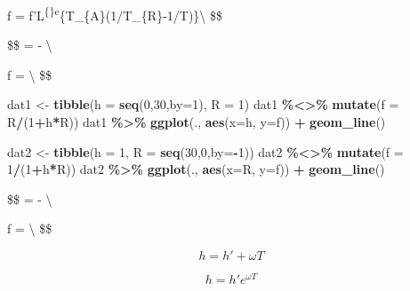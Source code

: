 \documentclass[
]{article}
\newenvironment{Shaded}{\begin{snugshade}}{\end{snugshade}}
\newcommand{\AttributeTok}[1]{\textcolor[rgb]{0.13,0.29,0.53}{#1}}
\newcommand{\DecValTok}[1]{\textcolor[rgb]{0.00,0.00,0.81}{#1}}
\newcommand{\FunctionTok}[1]{\textcolor[rgb]{0.13,0.29,0.53}{\textbf{#1}}}
\newcommand{\NormalTok}[1]{#1}
\newcommand{\OtherTok}[1]{\textcolor[rgb]{0.56,0.35,0.01}{#1}}
\newcommand{\SpecialCharTok}[1]{\textcolor[rgb]{0.81,0.36,0.00}{\textbf{#1}}}
\begin{document}
f =
f'L\textsuperscript{\{\gamma\}e}\{T\_\{A\}(1/T\_\{R\}-1/T)\}\textbackslash{}
\$\$

\$\$  = - 
\textbackslash{}

f = \textbackslash{} \$\$

\begin{Shaded}
\begin{Highlighting}[]
\NormalTok{dat1 }\OtherTok{\textless{}{-}} \FunctionTok{tibble}\NormalTok{(}\AttributeTok{h =} \FunctionTok{seq}\NormalTok{(}\DecValTok{0}\NormalTok{,}\DecValTok{30}\NormalTok{,}\AttributeTok{by=}\DecValTok{1}\NormalTok{),}
               \AttributeTok{R =} \DecValTok{1}\NormalTok{)}
\NormalTok{dat1 }\SpecialCharTok{\%\textless{}\textgreater{}\%} \FunctionTok{mutate}\NormalTok{(}\AttributeTok{f =}\NormalTok{ R}\SpecialCharTok{/}\NormalTok{(}\DecValTok{1}\SpecialCharTok{+}\NormalTok{h}\SpecialCharTok{*}\NormalTok{R))}
\NormalTok{dat1 }\SpecialCharTok{\%\textgreater{}\%} \FunctionTok{ggplot}\NormalTok{(., }\FunctionTok{aes}\NormalTok{(}\AttributeTok{x=}\NormalTok{h, }\AttributeTok{y=}\NormalTok{f)) }\SpecialCharTok{+} \FunctionTok{geom\_line}\NormalTok{()}

\NormalTok{dat2 }\OtherTok{\textless{}{-}} \FunctionTok{tibble}\NormalTok{(}\AttributeTok{h =} \DecValTok{1}\NormalTok{,}
               \AttributeTok{R =} \FunctionTok{seq}\NormalTok{(}\DecValTok{30}\NormalTok{,}\DecValTok{0}\NormalTok{,}\AttributeTok{by=}\SpecialCharTok{{-}}\DecValTok{1}\NormalTok{))}
\NormalTok{dat2 }\SpecialCharTok{\%\textless{}\textgreater{}\%} \FunctionTok{mutate}\NormalTok{(}\AttributeTok{f =} \DecValTok{1}\SpecialCharTok{/}\NormalTok{(}\DecValTok{1}\SpecialCharTok{+}\NormalTok{h}\SpecialCharTok{*}\NormalTok{R))}
\NormalTok{dat2 }\SpecialCharTok{\%\textgreater{}\%} \FunctionTok{ggplot}\NormalTok{(., }\FunctionTok{aes}\NormalTok{(}\AttributeTok{x=}\NormalTok{R, }\AttributeTok{y=}\NormalTok{f)) }\SpecialCharTok{+} \FunctionTok{geom\_line}\NormalTok{()}
\end{Highlighting}
\end{Shaded}

\$\$  =
-
\textbackslash{}

f =
\textbackslash{} \$\$

\[
h = h' + {\omega}T
\]

\[
h = h'e^{{\omega}T}
\]
\end{document}
